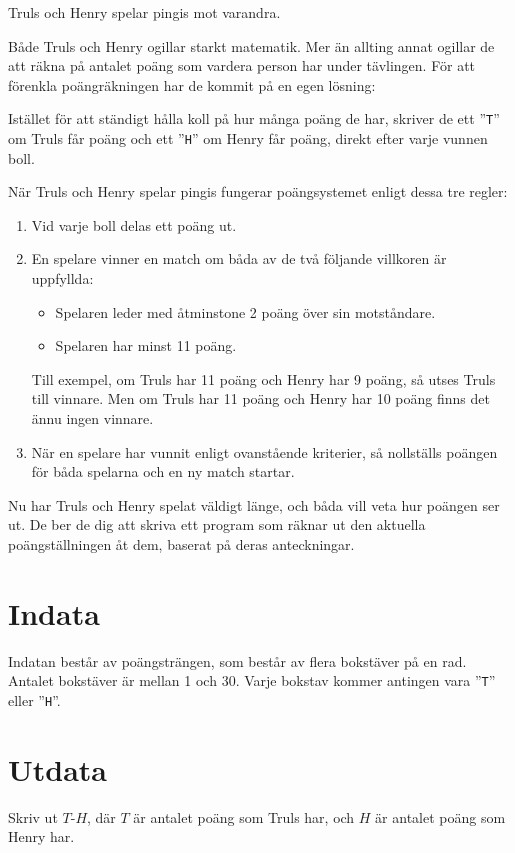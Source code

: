 \noindent

Truls och Henry spelar pingis mot varandra.

Både Truls och Henry ogillar starkt matematik.
Mer än allting annat ogillar de att räkna på antalet poäng som vardera person har under tävlingen.
För att förenkla poängräkningen har de kommit på en egen lösning:

Istället för att ständigt hålla koll på hur många poäng de har, skriver de 
ett ''\texttt{T}'' om Truls får poäng och ett ''\texttt{H}'' om Henry
får poäng, direkt efter varje vunnen boll.

När Truls och Henry spelar pingis fungerar poängsystemet enligt dessa tre regler:
\begin{enumerate}
  \item Vid varje boll delas ett poäng ut.
  \item En spelare vinner en match om båda av de två följande villkoren är uppfyllda:
  \begin{itemize}
    \item Spelaren leder med åtminstone 2 poäng över sin motståndare.
    \item Spelaren har minst 11 poäng.
  \end{itemize}
  Till exempel, om Truls har 11 poäng och Henry har 9 poäng, så utses Truls till vinnare. Men om Truls har 11 poäng och Henry har 10 poäng finns det ännu ingen vinnare.

  \item När en spelare har vunnit enligt ovanstående kriterier, så nollställs poängen för båda spelarna och en ny match startar.
\end{enumerate}

Nu har Truls och Henry spelat väldigt länge, och båda vill veta hur poängen ser ut.
De ber de dig att skriva ett program som
räknar ut den aktuella poängställningen åt dem, baserat på deras anteckningar.


\section*{Indata}
Indatan består av poängsträngen, som består av flera bokstäver på en rad. Antalet bokstäver är mellan 1 och 30. 
Varje bokstav kommer antingen vara ''\texttt{T}'' eller ''\texttt{H}''.

\section*{Utdata}
Skriv ut $T$-$H$, där $T$ är antalet poäng som Truls har, och $H$ är antalet poäng som Henry har.


